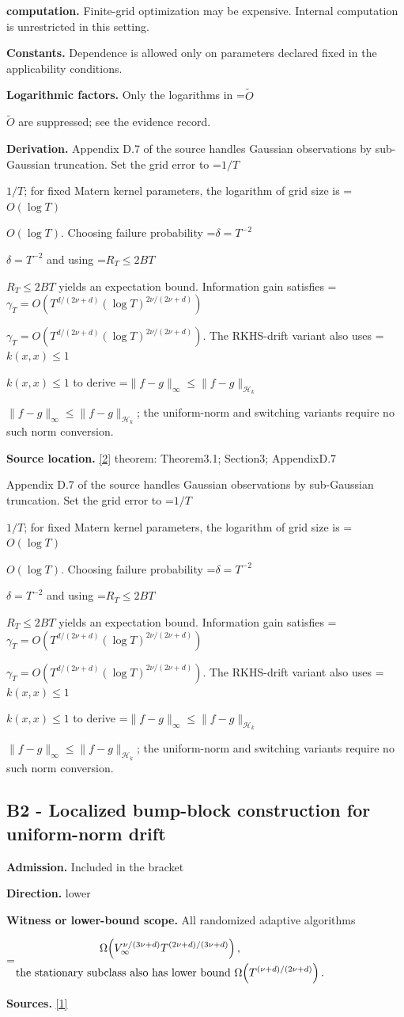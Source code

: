 \documentclass[10pt,a4paper]{article}
\newcommand{\AtlasMath}[1]{\par\begingroup\centering\setbox0=\hbox{$\displaystyle #1$}\ifdim\wd0>1.4\linewidth\typeout{ATLAS WIDE FORMULA: \the\wd0}\fi\ifdim\wd0>\linewidth\resizebox{\linewidth}{!}{\box0}\else\box0\fi\par\endgroup}
\newcommand{\AtlasInlineMath}[1]{\begingroup\setbox0=\hbox{$#1$}\ifdim\wd0>.4\linewidth\endgroup\AtlasMath{#1}\else\endgroup$#1$\fi}
\begin{document}
\textbf{computation.} Finite-grid optimization may be expensive. Internal computation is unrestricted in this setting.

\textbf{Constants.} Dependence is allowed only on parameters declared fixed in the applicability conditions.

\textbf{Logarithmic factors.} Only the logarithms in \AtlasInlineMath{\widetilde O} are suppressed; see the evidence record.

\textbf{Derivation.} Appendix D.7 of the source handles Gaussian observations by sub-Gaussian truncation. Set the grid error to \AtlasInlineMath{1/T}; for fixed Matern kernel parameters, the logarithm of grid size is \AtlasInlineMath{O(\log T)}. Choosing failure probability \AtlasInlineMath{\delta=T^{-2}} and using \AtlasInlineMath{R_T\le2BT} yields an expectation bound. Information gain satisfies \AtlasInlineMath{\gamma_T=O(T^{d/(2\nu+d)}(\log T)^{2\nu/(2\nu+d)})}. The RKHS-drift variant also uses \AtlasInlineMath{k(x,x)\le1} to derive \AtlasInlineMath{\|f-g\|_\infty\le\|f-g\|_{\mathcal H_k}}; the uniform-norm and switching variants require no such norm conversion.

\textbf{Source location.} \href{https://proceedings.mlr.press/v206/hong23b.html}{[2]} theorem: Theorem3.1; Section3; AppendixD.7

Appendix D.7 of the source handles Gaussian observations by sub-Gaussian truncation. Set the grid error to \AtlasInlineMath{1/T}; for fixed Matern kernel parameters, the logarithm of grid size is \AtlasInlineMath{O(\log T)}. Choosing failure probability \AtlasInlineMath{\delta=T^{-2}} and using \AtlasInlineMath{R_T\le2BT} yields an expectation bound. Information gain satisfies \AtlasInlineMath{\gamma_T=O(T^{d/(2\nu+d)}(\log T)^{2\nu/(2\nu+d)})}. The RKHS-drift variant also uses \AtlasInlineMath{k(x,x)\le1} to derive \AtlasInlineMath{\|f-g\|_\infty\le\|f-g\|_{\mathcal H_k}}; the uniform-norm and switching variants require no such norm conversion.

\subsection{B2 - Localized bump-block construction for uniform-norm drift}
\textbf{Admission.} Included in the bracket

\textbf{Direction.} lower

\textbf{Witness or lower-bound scope.} All randomized adaptive algorithms

\AtlasMath{\begin{gathered}\Omega\!\left(V_\infty^{\nu/(3\nu+d)}T^{(2\nu+d)/(3\nu+d)}\right),\\ \text{\text{the stationary subclass also has lower bound} }\Omega\!\left(T^{(\nu+d)/(2\nu+d)}\right).\end{gathered}}
\textbf{Sources.} \href{https://raw.githubusercontent.com/mlresearch/v258/main/assets/cai25a/cai25a.pdf}{[1]}
\end{document}
